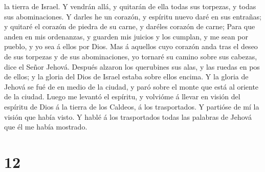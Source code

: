 la tierra de Israel.  Y vendrán allá, y quitarán de ella
todas sus torpezas, y todas sus abominaciones.  Y darles
he un corazón, y espíritu nuevo daré en sus entrañas; y quitaré el
corazón de piedra de su carne, y daréles corazón de carne;
 Para que anden en mis ordenanzas, y guarden mis juicios
y los cumplan, y me sean por pueblo, y yo sea á ellos por Dios.
 Mas á aquellos cuyo corazón anda tras el deseo de sus
torpezas y de sus abominaciones, yo tornaré su camino sobre sus cabezas,
dice el Señor Jehová.  Después alzaron los querubines sus
alas, y las ruedas en pos de ellos; y la gloria del Dios de Israel
estaba sobre ellos encima.  Y la gloria de Jehová se fué
de en medio de la ciudad, y paró sobre el monte que está al oriente de
la ciudad.  Luego me levantó el espíritu, y volvióme á
llevar en visión del espíritu de Dios á la tierra de los Caldeos, á los
trasportados. Y partióse de mí la visión que había visto.
 Y hablé á los trasportados todas las palabras de Jehová
que él me había mostrado.

\hypertarget{section-11}{%
\section{12}\label{section-11}}

